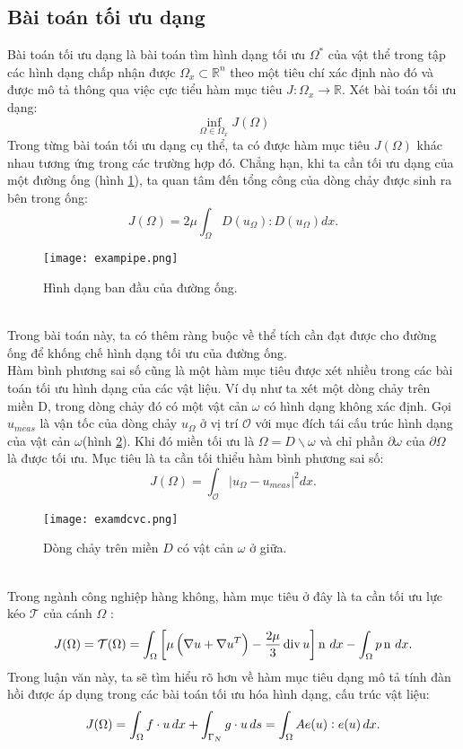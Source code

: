 \documentclass[
12pt, %
oneside, %
english, %
onehalfspacing, %
nolistspacing, %
headsepline, %
addchap,
]{MastersDoctoralThesis} %
\begin{document}
\subsection{Bài toán tối ưu dạng}
Bài toán tối ưu dạng là bài toán tìm hình dạng tối ưu $\Omega^*$ của vật thể trong tập các hình dạng chấp nhận được $\Omega_x\subset\mathbb{R}^n$ theo một tiêu chí xác định nào đó và được mô tả thông qua việc cực tiểu hàm mục tiêu $J:\Omega_x\rightarrow\mathbb{R}$. Xét bài toán tối ưu dạng:
\begin{equation}\label{bt:toiuidang}
\inf_{\Omega\in\Omega_x}J(\Omega)
\end{equation}
Trong từng bài toán tối ưu dạng cụ thể, ta có được hàm mục tiêu $J(\Omega)$ khác nhau tương ứng trong các trường hợp đó. Chẳng hạn, khi ta cần tối ưu dạng của một đường ống (hình \ref{fig:exampipe}), ta quan tâm đến tổng công của dòng chảy được sinh ra bên trong ống:
$$J(\Omega) = 2\mu\int_\Omega D(u_\Omega):D(u_\Omega)dx.$$
\begin{figure}[http]
\centering
\texttt{[image: exampipe.png]}
\caption{Hình dạng ban đầu của đường ống.}
\label{fig:exampipe}
\end{figure}\\
Trong bài toán này, ta có thêm ràng buộc về thể tích cần đạt được cho đường ống để khống chế hình dạng tối ưu của đường ống.\\
Hàm bình phương sai số cũng là một hàm mục tiêu được xét nhiều trong các bài toán tối ưu hình dạng của các vật liệu. Ví dụ như ta xét một dòng chảy trên miền D, trong dòng chảy đó có một vật cản $\omega$ có hình dạng không xác định. Gọi $u_{meas}$ là vận tốc của dòng chảy $u_\Omega$ ở vị trí $\mathcal{O}$ với mục đích  tái cấu trúc hình dạng của vật cản $\omega$(hình \ref{fig:examdcvc}). Khi đó miền tối ưu là $\Omega = D\backslash\omega$ và chỉ phần $\partial\omega$ của $\partial\Omega$ là được tối ưu. Mục tiêu là ta cần tối thiểu hàm bình phương sai số:
$$J(\Omega)=\int_\mathcal{O}|u_\Omega - u_{meas}|^2dx.$$
\begin{figure}[http]
\centering
\texttt{[image: examdcvc.png]}
\caption{Dòng chảy trên miền $D$ có vật cản $\omega$ ở giữa.}
\label{fig:examdcvc}
\end{figure}\\
Trong ngành công nghiệp hàng không, hàm mục tiêu ở đây là ta cần tối ưu lực kéo $\mathcal{T}$ của cánh $\Omega$ \cite{Pir84, MP10}:
$$J(\Omega)=\mathcal{T}(\Omega)=\int_\Omega \left[\mu \left(\nabla u + \nabla u^T\right) - \frac{2\mu}{3} \operatorname{div} u \right]\operatorname{n} \,dx  - \int_\Omega p\operatorname{n} \,dx.$$
Trong luận văn này, ta sẽ tìm hiểu rõ hơn về hàm mục tiêu dạng mô tả tính đàn hồi được áp dụng trong các bài toán tối ưu hóa hình dạng, cấu trúc vật liệu:
\begin{equation}\label{eq:hmt}
J(\Omega)=\int_\Omega f\cdot u\,dx + \int_{\Gamma_N} g \cdot u \,ds = \int_{\Omega} Ae(u):e(u)\,dx.
\end{equation}
\end{document}
